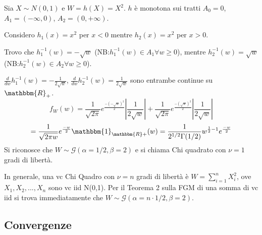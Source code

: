 \noindent Sia $X \sim N(0,1)$ e $W=h(X)=X^2$. $h$ è monotona sui tratti $A_0={0}$, $A_1=(-\infty,0)$, $A_2=(0,+\infty)$. 

\noindent Considero $h_1(x)=x^2$ per $x<0$ mentre $h_2(x)=x^2$ per $x>0$.

\noindent Trovo che $h_1^{-1}(w)=-\sqrt{w}$ (NB:$h_1^{-1}(w)\in A_1 \forall w \geq 0$), mentre $h_2^{-1}(w)=\sqrt{w}$ (NB:$h_2^{-1}(w)\in A_2 \forall w \geq 0$).
 
\noindent $\frac{d}{dw} h_1^{-1}(w)=-\frac{1}{2\sqrt{w}}$, $\frac{d}{dw} h_2^{-1}(w)=\frac{1}{2\sqrt{w}}$ sono entrambe continue su $\mathbbm{R}_+$.
$$f_W(w)=\frac{1}{\sqrt{2\pi}}e^{\frac{-(-\sqrt{w})^2 }{2}}\left|\frac{1}{2\sqrt{w}}\right|+\frac{1}{\sqrt{2\pi}}e^{\frac{-(\sqrt{w})^2 }{2}}\left|\frac{1}{2\sqrt{w}}\right|$$ 
$$=\frac{1}{\sqrt{2\pi w}}
e^{\frac{-w}{2}}\mathbbm{1}_{\mathbbm{R}+}
(w)=\frac{1}{2^{1/2}\Gamma(1/2)}
w^{\frac{1}{2}-1}e^{\frac{-w}{2}}$$
Si riconosce che $W \sim \mathcal{G}(\alpha=1/2,\beta=2)$ e si chiama Chi quadrato con $\nu=1$ gradi di libertà.

In generale, una vc Chi Quadro con $\nu=n$ gradi di libertà è $W=\sum_{i=1}^n X_i^2$, ove $X_1,X_2,...,X_n$ sono vc iid N(0,1). Per il Teorema 2 sulla FGM di una somma di vc iid si trova immediatamente che $W \sim \mathcal{G}(\alpha=n \cdot 1/2,\beta=2)$.
\subsection{Convergenze}
